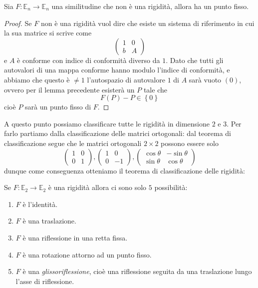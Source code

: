 \documentclass[11pt]{scrartcl}
\begin{document}
   	 \begin{corollary}
   	 	Sia $F:\mathbb{E}_n\to \mathbb{E}_n$ una similitudine che non è una rigidità, allora ha un punto fisso.
   	 \end{corollary}
   	 \begin{proof}
   	 	Se $F$ non è una rigidità vuol dire che esiste un sistema di riferimento in cui la sua matrice si scrive come
   	 	$$
   	 	\left(
   	 	\begin{array}{c|c}
   	 		1 & 0 \\
   	 		\hline
   	 		b & A
   	 	\end{array}
   	 	\right)
   	 	$$
   	 	e $A$ è conforme con indice di conformità diverso da $1$. Dato che tutti gli autovalori di una mappa conforme hanno modulo l'indice di conformità, e abbiamo che questo è $\ne 1$ l'autospazio di autovalore $1$ di $A$ sarà vuoto $\left(0\right)$, ovvero per il lemma precedente esisterà un $P$ tale che
   	 	$$F(P)-P\in \left\{0\right\}$$
   	 	cioè $P$ sarà un punto fisso di $F$.
   	 \end{proof}
   	 A questo punto possiamo classificare tutte le rigidità in dimensione $2$ e $3$. Per farlo partiamo dalla classificazione delle matrici ortogonali: dal teorema di classificazione segue che le matrici ortogonali $2\times 2$ possono essere solo
   	 $$
   	 \begin{pmatrix}
   	 	1 & 0 \\
   	 	0 & 1
   	 \end{pmatrix},
   	 \begin{pmatrix}
   	 	1 & 0 \\
   	 	0 & -1
   	 \end{pmatrix},
   	 \begin{pmatrix}
   	 	\cos\theta & -\sin\theta \\
   	 	\sin\theta & \cos\theta
   	 \end{pmatrix}
   	 $$
   	 dunque come conseguenza otteniamo il teorema di classificazione delle rigidità:
   	 \begin{theorem}
   	 	Se $F:\mathbb{E}_2\to\mathbb{E}_2$ è una rigidità allora ci sono solo $5$ possibilità:
   	 	\begin{enumerate}
   	 		\item $F$ è l'identità.
   	 		\item $F$ è una traslazione.
   	 		\item $F$ è una riflessione in una retta fissa.
   	 		\item $F$ è una rotazione attorno ad un punto fisso.
   	 		\item $F$ è una \textit{glissoriflessione}, cioè una riflessione seguita da una traslazione lungo l'asse di riflessione.
   	 	\end{enumerate}
   	 \end{theorem}
\end{document}
